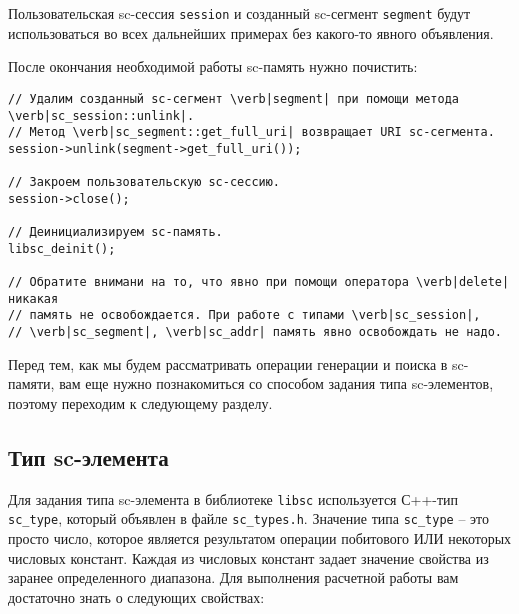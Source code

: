 Пользовательская sc-сессия \lstinline{session} и созданный sc-сегмент
\lstinline{segment} будут использоваться во всех дальнейших примерах
без какого-то явного объявления.

После окончания необходимой работы sc-память нужно почистить:

\begin{lstlisting}[texcl]
// Удалим созданный sc-сегмент \verb|segment| при помощи метода \verb|sc_session::unlink|.
// Метод \verb|sc_segment::get_full_uri| возвращает URI sc-сегмента.
session->unlink(segment->get_full_uri());

// Закроем пользовательскую sc-сессию.
session->close();

// Деинициализируем sc-память.
libsc_deinit();

// Обратите внимани на то, что явно при помощи оператора \verb|delete| никакая 
// память не освобождается. При работе с типами \verb|sc_session|,
// \verb|sc_segment|, \verb|sc_addr| память явно освобождать не надо.
\end{lstlisting}

Перед тем, как мы будем рассматривать операции генерации и поиска в
sc-памяти, вам еще нужно познакомиться со способом задания типа
sc-элементов, поэтому переходим к следующему разделу.

\subsection{Тип sc-элемента}
\label{sec:libsc_types}

Для задания типа sc-элемента в библиотеке \texttt{libsc} используется
С++-тип \lstinline{sc_type}, который объявлен в файле
\verb|sc_types.h|. Значение типа \lstinline{sc_type} – это просто
число, которое является результатом операции побитового ИЛИ некоторых
числовых констант. Каждая из числовых констант задает значение
свойства из заранее определенного диапазона. Для выполнения расчетной
работы вам достаточно знать о следующих свойствах:

